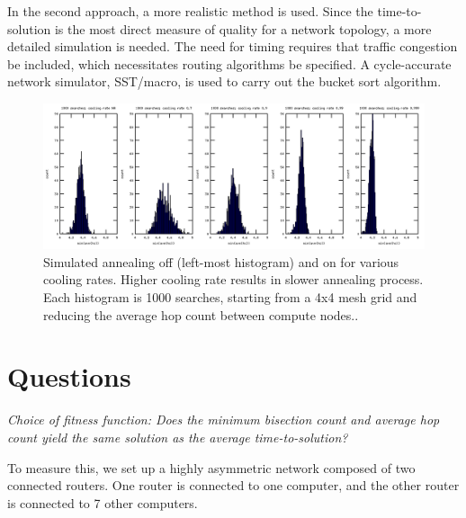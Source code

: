 \documentclass[pdftex]{article}
\begin{document}
In the second approach, a more realistic method is used. 
Since the time-to-solution is the most direct measure of quality for a network topology, a more detailed simulation is needed. The need for timing requires that traffic congestion be included, which necessitates routing algorithms be specified. A cycle-accurate network simulator, SST/macro, is used to carry out the bucket sort algorithm. 

\begin{figure}
\includegraphics[scale=0.5]{pictures/Simulated_annealiing_OFF_and_ON_comparison_of_cooling_rates_1000searches}
\caption{Simulated annealing off (left-most histogram) and on for various cooling rates. Higher cooling rate results in slower annealing process. Each histogram is 1000 searches, starting from a 4x4 mesh grid and reducing the average hop count between compute nodes..}
\end{figure}


\section{Questions}

\textit{Choice of fitness function: Does the minimum bisection count and average hop count yield the same solution as the average time-to-solution?}

To measure this, we set up a highly asymmetric network composed of two connected routers. One router is connected to one computer, and the other router is connected to 7 other computers. 
\end{document}
